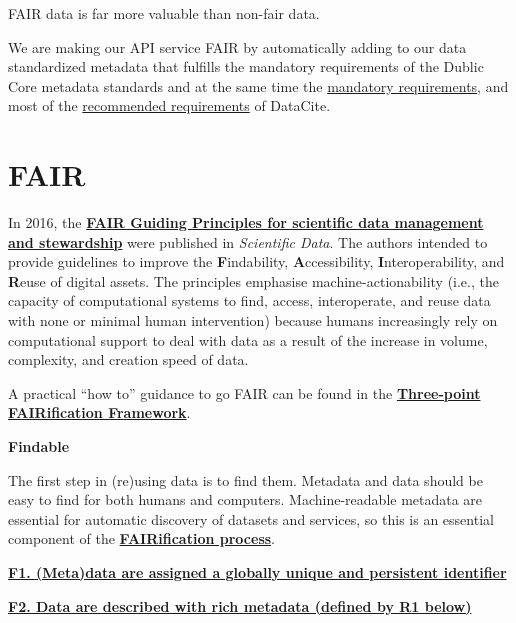 \documentclass[
  a4paper,
  openany, a4paper, oneside]{book}
\begin{document}
FAIR data is far more valuable than non-fair data.

We are making our API service FAIR by automatically adding to our data standardized metadata that fulfills the mandatory requirements of the Dublic Core metadata standards and at the same time the \href{https://support.datacite.org/docs/datacite-metadata-schema-v44-mandatory-properties}{mandatory requirements}, and most of the \href{https://support.datacite.org/docs/datacite-metadata-schema-v44-recommended-and-optional-properties}{recommended requirements} of DataCite.

\hypertarget{FAIR}{%
\section{FAIR}\label{FAIR}}

In 2016, the \textbf{\href{http://www.nature.com/articles/sdata201618}{FAIR Guiding Principles for scientific data management and stewardship}} were published in \emph{Scientific Data}. The authors intended to provide guidelines to improve the \textbf{F}indability, \textbf{A}ccessibility, \textbf{I}nteroperability, and \textbf{R}euse of digital assets. The principles emphasise machine-actionability (i.e., the capacity of computational systems to find, access, interoperate, and reuse data with none or minimal human intervention) because humans increasingly rely on computational support to deal with data as a result of the increase in volume, complexity, and creation speed of data.

A practical ``how to'' guidance to go FAIR can be found in the \textbf{\href{https://www.go-fair.org/how-to-go-fair/}{Three-point FAIRification Framework}}.

\textbf{{F}indable}

The first step in (re)using data is to find them. Metadata and data should be easy to find for both humans and computers. Machine-readable metadata are essential for automatic discovery of datasets and services, so this is an essential component of the \textbf{\href{https://www.go-fair.org/fair-principles/fairification-process/}{FAIRification process}}.

\textbf{\href{https://www.go-fair.org/fair-principles/fair-data-principles-explained/f1-meta-data-assigned-globally-unique-persistent-identifiers/}{F1. (Meta)data are assigned a globally unique and persistent identifier}}

\textbf{\href{https://www.go-fair.org/fair-principles/fair-data-principles-explained/f2-data-described-rich-metadata/}{F2. Data are described with rich metadata (defined by R1 below)}}
\end{document}
